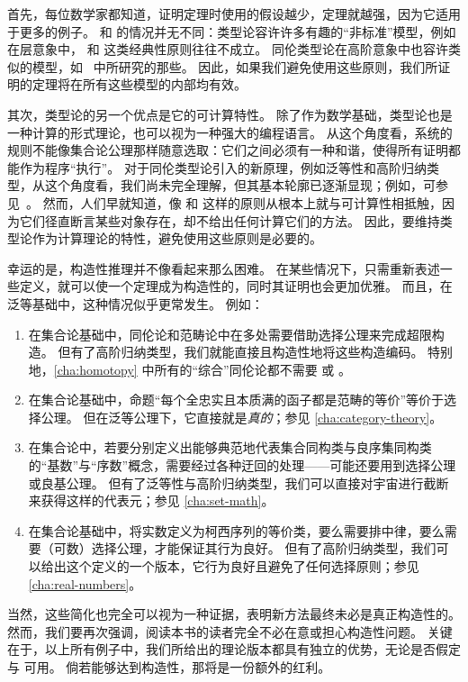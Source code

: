 首先，每位数学家都知道，证明定理时使用的假设越少，定理就越强，因为它适用于更多的例子。
\choice{} 和 \LEM{} 的情况并无不同：类型论容许许多有趣的``非标准''模型，例如在层意象中，\choice{} 和 \LEM{} 这类经典性原则往往不成立。
%
同伦类型论在高阶意象中也容许类似的模型，如~\cite{ToenVezzosi02,Rezk05,lurie:higher-topoi} 中所研究的那些。
因此，如果我们避免使用这些原则，我们所证明的定理将在所有这些模型的内部均有效。

其次，类型论的另一个优点是它的可计算特性。
除了作为数学基础，类型论也是一种计算的形式理论，也可以视为一种强大的编程语言。
%
从这个角度看，系统的规则不能像集合论公理那样随意选取：它们之间必须有一种和谐，使得所有证明都能作为程序``执行''。
对于同伦类型论引入的新原理，例如泛等性和高阶归纳类型，从这个角度看，我们尚未完全理解，但其基本轮廓已逐渐显现；例如，可参见~\cite{lh:canonicity}。
然而，人们早就知道，像 \choice{} 和 \LEM{} 这样的原则从根本上就与可计算性相抵触，因为它们径直断言某些对象存在，却不给出任何计算它们的方法。
因此，要维持类型论作为计算理论的特性，避免使用这些原则是必要的。

幸运的是，构造性推理并不像看起来那么困难。
在某些情况下，只需重新表述一些定义，就可以使一个定理成为构造性的，同时其证明也会更加优雅。
而且，在泛等基础中，这种情况似乎更常发生。
例如：

\begin{enumerate}
\item 在集合论基础中，同伦论和范畴论中在多处需要借助选择公理来完成超限构造。
  但有了高阶归纳类型，我们就能直接且构造性地将这些构造编码。
  特别地，\cref{cha:homotopy} 中所有的``综合''同伦论都不需要 \LEM{} 或 \choice{}。
\item 在集合论基础中，命题``每个全忠实且本质满的函子都是范畴的等价''等价于选择公理。
  但在泛等公理下，它直接就是\emph{真的}；参见 \cref{cha:category-theory}。
\item 在集合论中，若要分别定义出能够典范地代表集合同构类与良序集同构类的``基数''与``序数''概念，需要经过各种迂回的处理——可能还要用到选择公理或良基公理。
  但有了泛等性与高阶归纳类型，我们可以直接对宇宙进行截断来获得这样的代表元；参见 \cref{cha:set-math}。
\item 在集合论基础中，将实数定义为柯西序列的等价类，要么需要排中律，要么需要（可数）选择公理，才能保证其行为良好。
  但有了高阶归纳类型，我们可以给出这个定义的一个版本，它行为良好且避免了任何选择原则；参见 \cref{cha:real-numbers}。
\end{enumerate}

当然，这些简化也完全可以视为一种证据，表明新方法最终未必是真正构造性的。
然而，我们要再次强调，阅读本书的读者完全不必在意或担心构造性问题。
关键在于，以上所有例子中，我们所给出的理论版本都具有独立的优势，无论是否假定 \LEM{} 与 \choice{} 可用。
倘若能够达到构造性，那将是一份额外的红利。%

